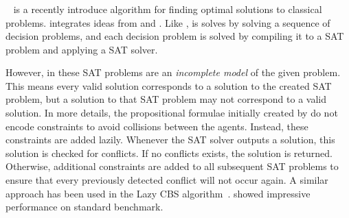 \subsubsection{\smtcbsO}
\label{sec:smtcbs}







\smtcbsO~\cite{DBLP:conf/ijcai/Surynek19} is a recently introduce algorithm for finding optimal solutions to classical \mapf problems. \smtcbsO integrates ideas from \cbs and \mddsat. Like \mddsat, is solves \mapf by solving a sequence of decision problems, and each decision problem is solved by compiling it to a SAT problem and applying a SAT solver. 


However, in \smtcbsO these SAT problems are an \emph{incomplete model} of the given \mapf problem. This means every valid \mapf solution corresponds to a solution to the created SAT problem, 
but a solution to that SAT problem may not correspond to a valid \mapf solution. In more details, the propositional formulae initially created by \smtcbsO do not encode constraints to avoid collisions between the agents. Instead, these constraints are added lazily. Whenever the SAT solver outputs a solution, this solution is checked for conflicts. If no conflicts exists, the solution is returned. Otherwise, additional constraints are added to all subsequent SAT problems to ensure that every previously detected conflict will not occur again. A similar approach has been used in the Lazy CBS algorithm~\cite{gange2019lazy}. 
\smtcbsO showed impressive performance on standard \mapf benchmark. 